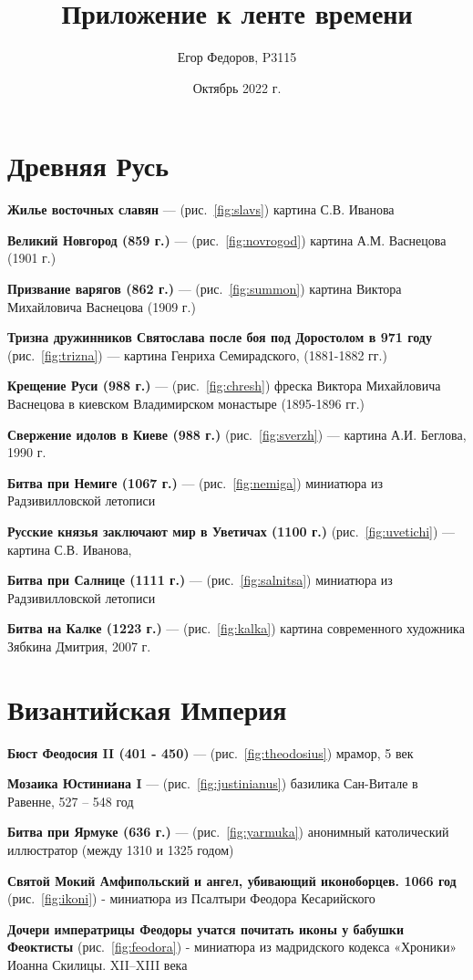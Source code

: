 \documentclass[a4paper,14pt]{article}
\title{Приложение к ленте времени}
\author{Егор Федоров, P3115}
\date{Октябрь 2022 г.}
\begin{document}
\pagestyle{fancy}
\section*{Древняя Русь}
\textbf{Жилье восточных славян} --- (рис.~\ref{fig:slavs}) картина С.В. Иванова

\textbf{Великий Новгород (859 г.)} --- (рис.~\ref{fig:novrogod}) картина А.М. Васнецова (1901 г.)

\textbf{Призвание варягов (862 г.)} --- (рис.~\ref{fig:summon}) картина Виктора Михайловича Васнецова (1909 г.)

\textbf{Тризна дружинников Святослава после боя под Доростолом в 971 году} (рис.~\ref{fig:trizna}) --- картина Генриха Семирадского, (1881-1882 гг.)

\textbf{Крещение Руси (988 г.)} --- (рис.~\ref{fig:chresh}) фреска Виктора Михайловича Васнецова в киевском Владимирском монастыре (1895-1896 гг.)

\textbf{Свержение идолов в Киеве (988 г.)} (рис.~\ref{fig:sverzh}) --- картина А.И. Беглова, 1990 г.

\textbf{Битва при Немиге (1067 г.)} --- (рис.~\ref{fig:nemiga}) миниатюра из Радзивилловской летописи

\textbf{Русские князья заключают мир в Уветичах (1100 г.)} (рис.~\ref{fig:uvetichi}) --- картина С.В. Иванова, 

\textbf{Битва при Салнице (1111 г.)} --- (рис.~\ref{fig:salnitsa}) миниатюра из Радзивилловской летописи

\textbf{Битва на Калке (1223 г.)} --- (рис.~\ref{fig:kalka}) картина современного художника Зябкина Дмитрия, 2007 г.

\section*{Византийская Империя}
\textbf{Бюст Феодосия II (401 - 450)} --- (рис.~\ref{fig:theodosius}) мрамор, 5 век


\textbf{Мозаика Юстиниана I} --- (рис.~\ref{fig:justinianus}) базилика Сан-Витале в Равенне, 527 -- 548 год

\textbf{Битва при Ярмуке (636 г.)} --- (рис.~\ref{fig:yarmuka}) анонимный католический иллюстратор (между 1310 и 1325 годом)

\textbf{Святой Мокий Амфипольский и ангел, убивающий иконоборцев. 1066 год} (рис.~\ref{fig:ikoni})  - миниатюра из Псалтыри Феодора Кесарийского

\textbf{Дочери императрицы Феодоры учатся почитать иконы у бабушки Феоктисты} (рис.~\ref{fig:feodora})  - миниатюра из мадридского кодекса «Хроники» Иоанна Скилицы. XII–XIII века 
\end{document}

